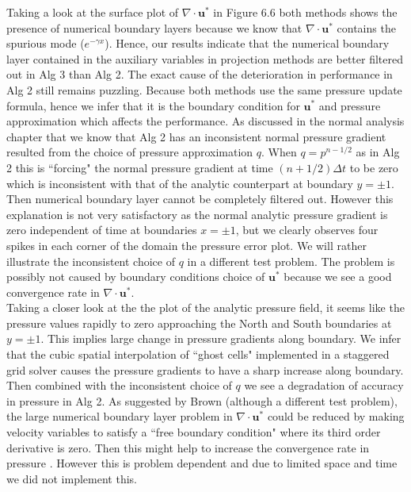Taking a look at the surface plot of $\nabla \cdot \textbf{u}^*$ in Figure 6.6 both methods shows the presence of numerical boundary layers because we know that $\nabla \cdot \textbf{u}^*$ contains the spurious mode ($e^{-\gamma x}$). Hence, our results indicate that the numerical boundary layer contained in the auxiliary variables in projection methods are better filtered out in Alg 3 than Alg 2. The exact cause of the deterioration in performance in Alg 2 still remains puzzling. Because both methods use the same pressure update formula, hence we infer that it is the boundary condition for $\textbf{u} ^*$ and pressure approximation which affects the performance. As discussed in the normal analysis chapter that we know that Alg 2 has an inconsistent normal pressure gradient resulted from the choice of pressure approximation $q$. When $q = p^{n-1/2}$ as in Alg 2 this is ``forcing" the normal pressure gradient at time $(n+1/2)\Delta t$ to be zero which is inconsistent with that of the analytic counterpart at boundary $y = \pm 1$. Then numerical boundary layer cannot be completely filtered out. However this explanation is not very satisfactory as the normal analytic pressure gradient is zero independent of time at boundaries $x = \pm 1$, but we clearly observes four spikes in each corner of the domain the pressure error plot. We will rather illustrate the inconsistent choice of $q$ in a different test problem. The problem is possibly not caused by boundary conditions choice of $\textbf{u}^*$ because we see a good convergence rate in $\nabla \cdot\textbf{u}^*$. \\

Taking a closer look at the the plot of the analytic pressure field, it seems like the pressure values rapidly to zero approaching the North and South boundaries at $y=\pm 1$. This implies large change in pressure gradients along boundary. We infer that the cubic spatial interpolation of ``ghost cells" implemented in a staggered grid solver causes the pressure gradients to have a sharp increase along boundary. Then combined with the inconsistent choice of $q$ we see a degradation of accuracy in pressure in Alg 2. As suggested by Brown (although a different test problem), the large numerical boundary layer problem in $\nabla \cdot\textbf{u}^*$ could be reduced by making velocity variables to satisfy a ``free boundary condition" where its third order derivative is zero. Then this might help to increase the convergence rate in pressure \cite{brown2001accurate}. However this is problem dependent and due to limited space and time we did not implement this.\\


